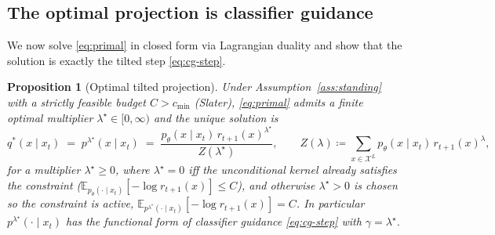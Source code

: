 \documentclass{article}
\newtheorem{proposition}{Proposition}
\newcommand{\E}{\mathbb{E}}
\newcommand{\X}{\mathcal{X}}
\newcommand{\lstar}{\lambda^{\star}}
\begin{document}
\subsection{The optimal projection is classifier guidance}
We now solve \eqref{eq:primal} in closed form via Lagrangian duality and show that the solution is exactly the tilted step \eqref{eq:cg-step}.

\begin{proposition}[Optimal tilted projection]
\label{prop:tilt}
Under Assumption~\ref{ass:standing} with a strictly feasible budget $C>c_{\min}$ (Slater), \eqref{eq:primal} admits a finite optimal multiplier $\lstar\in[0,\infty)$ and the unique solution is
\begin{equation}
\label{eq:qlam}
q^{*}(x\mid x_t)\;=\;p^{\lstar}(x\mid x_t)\;=\;\frac{p_\theta(x\mid x_t)\,r_{t+1}(x)^{\lstar}}{Z(\lstar)},
\qquad
Z(\lambda)\coloneqq\sum_{x\in\X^L}p_\theta(x\mid x_t)\,r_{t+1}(x)^{\lambda},
\end{equation}
for a multiplier $\lstar\ge 0$, where $\lstar=0$ iff the unconditional kernel already satisfies the constraint ($\E_{p_\theta(\cdot\mid x_t)}[-\log r_{t+1}(x)]\le C$), and otherwise $\lstar>0$ is chosen so the constraint is active, $\E_{p^{\lstar}(\cdot\mid x_t)}[-\log r_{t+1}(x)]=C$. In particular $p^{\lstar}(\cdot\mid x_t)$ has the functional form of classifier guidance \eqref{eq:cg-step} with $\gamma=\lstar$.
\end{proposition}
\end{document}
